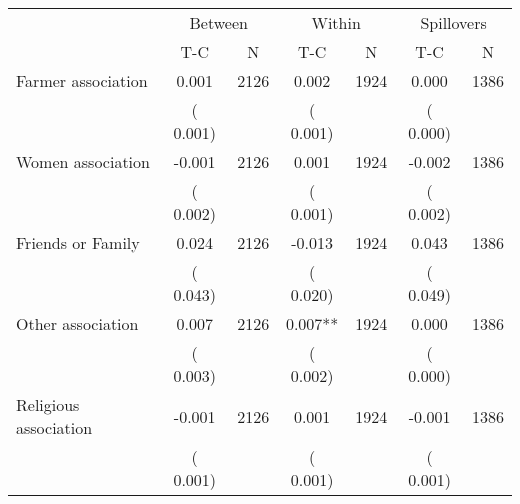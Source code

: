 
\begin{tabular}{l*{6}{c}}\hline&\multicolumn{2}{c}{Between}&\multicolumn{2}{c}{Within}&\multicolumn{2}{c}{Spillovers} \\ \cmidrule(r){2-3}\cmidrule(l){4-5}\cmidrule(l){6-7} & {T-C} & {N} & {T-C} & {N}  & {T-C}  & {N}  \\ \midrule
Farmer association        &              0.001      &       2126       &              0.002      &       1924       &              0.000      &       1386       \\
                       &       (       0.001)            &                               &       (       0.001)            &                               &       (       0.000)            &                               \\
Women association        &             -0.001      &       2126       &              0.001      &       1924       &             -0.002      &       1386       \\
                       &       (       0.002)            &                               &       (       0.001)            &                               &       (       0.002)            &                               \\
Friends or Family        &              0.024      &       2126       &             -0.013      &       1924       &              0.043      &       1386       \\
                       &       (       0.043)            &                               &       (       0.020)            &                               &       (       0.049)            &                               \\
Other association        &              0.007      &       2126       &              0.007**      &       1924       &              0.000      &       1386       \\
                       &       (       0.003)            &                               &       (       0.002)            &                               &       (       0.000)            &                               \\
Religious association        &             -0.001      &       2126       &              0.001      &       1924       &             -0.001      &       1386       \\
                       &       (       0.001)            &                               &       (       0.001)            &                               &       (       0.001)            &                               \\

\end{tabular}
